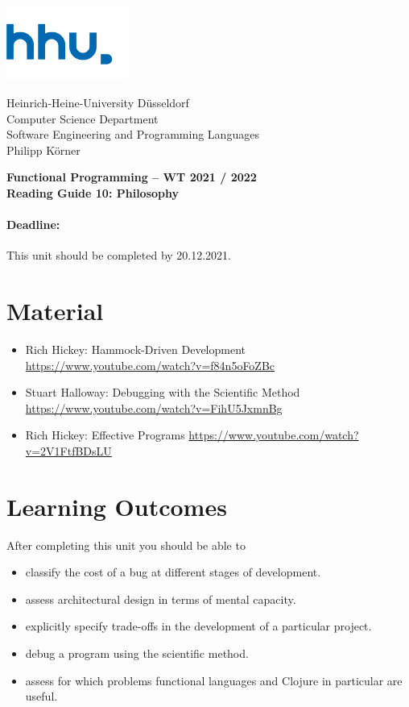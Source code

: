 \documentclass[11pt,a4paper]{article}
\begin{document}
\begin{minipage}[b]{\textwidth}
	\parbox[t]{5cm}{%
		\includegraphics[width=4cm]{unilogo}
		\hfill
	}
	\parbox[b]{11cm}{%
		Heinrich-Heine-University D\"usseldorf\\
		Computer Science Department\\
		Software Engineering and Programming Languages\\
		Philipp K\"orner
	}
\end{minipage}
\begin{center}
	\bf
	Functional Programming -- WT 2021 / 2022\\
	Reading Guide 10: Philosophy
\end{center}

\pagestyle{empty}

\paragraph{Deadline:} This unit should be completed by 20.12.2021.

\section{Material} 

\begin{itemize}
\item Rich Hickey: Hammock-Driven Development \url{https://www.youtube.com/watch?v=f84n5oFoZBc}
\item Stuart Halloway: Debugging with the Scientific Method \url{https://www.youtube.com/watch?v=FihU5JxmnBg}
\item Rich Hickey: Effective Programs \url{https://www.youtube.com/watch?v=2V1FtfBDsLU}
\end{itemize}


\section{Learning Outcomes}

After completing this unit you should be able to

\begin{itemize}
    \item classify the cost of a bug at different stages of development.
    \item assess architectural design in terms of mental capacity.
    \item explicitly specify trade-offs in the development of a particular project.
    \item debug a program using the scientific method.
    \item assess for which problems functional languages and Clojure in particular are useful.
\end{itemize}
\end{document}
